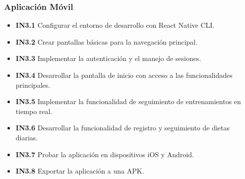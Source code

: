 \subsubsection{Aplicación Móvil}
\begin{itemize}
    \item \textbf{IN3.1} Configurar el entorno de desarrollo con React Native CLI.
    \item \textbf{IN3.2} Crear pantallas básicas para la navegación principal.
    \item \textbf{IN3.3} Implementar la autenticación y el manejo de sesiones.
    \item \textbf{IN3.4} Desarrollar la pantalla de inicio con acceso a las funcionalidades principales.
    \item \textbf{IN3.5} Implementar la funcionalidad de seguimiento de entrenamientos en tiempo real.
    \item \textbf{IN3.6} Desarrollar la funcionalidad de registro y seguimiento de dietas diarias.
    \item \textbf{IN3.7} Probar la aplicación en dispositivos iOS y Android.
    \item \textbf{IN3.8} Exportar la aplicación a una APK.
\end{itemize}